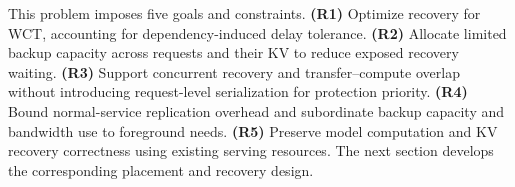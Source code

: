 This problem imposes five goals and constraints.
\textbf{(R1)} Optimize recovery for WCT, accounting for dependency-induced
delay tolerance.
\textbf{(R2)} Allocate limited backup capacity across requests and their
KV to reduce exposed recovery waiting.
\textbf{(R3)} Support concurrent recovery and transfer--compute overlap
without introducing request-level serialization for protection priority.
\textbf{(R4)} Bound normal-service replication overhead and subordinate
backup capacity and bandwidth use to foreground needs.
\textbf{(R5)} Preserve model computation and KV recovery correctness using
existing serving resources.
The next section develops the corresponding placement and recovery design.
